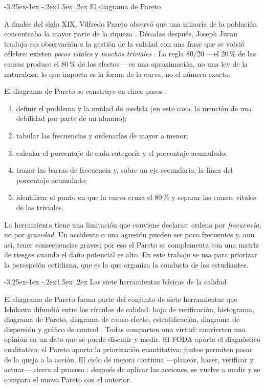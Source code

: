 \documentclass[11pt,a4paper]{article}
\makeatletter
\renewcommand\subsection{\@startsection{subsection}{2}{\z@}%
  {-3.25ex\@plus -1ex \@minus -.2ex}{1.5ex \@plus .2ex}%
  {\normalfont\large\bfseries\color{uazblue!85!black}}}
\makeatother
\begin{document}
\subsection{El diagrama de Pareto}

A finales del siglo XIX, Vilfredo Pareto observó que una minoría de la población
concentraba la mayor parte de la riqueza \cite{pareto1896}. Décadas después,
Joseph Juran tradujo esa observación a la gestión de la calidad con una frase
que se volvió célebre: existen \emph{pocos vitales} y \emph{muchos triviales}
\cite{juran2015}. La regla 80/20 ---el 20\,\% de las causas produce el 80\,\% de
los efectos--- es una aproximación, no una ley de la naturaleza; lo que importa
es la forma de la curva, no el número exacto.

El diagrama de Pareto se construye en cinco pasos \cite{gutierrez2014}:
\begin{enumerate}
  \item definir el problema y la unidad de medida (en este caso, la mención de
        una debilidad por parte de un alumno);
  \item tabular las frecuencias y ordenarlas de mayor a menor;
  \item calcular el porcentaje de cada categoría y el porcentaje acumulado;
  \item trazar las barras de frecuencia y, sobre un eje secundario, la línea
        del porcentaje acumulado;
  \item identificar el punto en que la curva cruza el 80\,\% y separar las
        causas vitales de las triviales.
\end{enumerate}

La herramienta tiene una limitación que conviene declarar: ordena por
\emph{frecuencia}, no por \emph{gravedad}. Un accidente o una agresión pueden
ser poco frecuentes y, aun así, tener consecuencias graves; por eso el Pareto
se complementa con una matriz de riesgos cuando el daño potencial es alto. En
este trabajo se usa para priorizar la percepción cotidiana, que es la que
organiza la conducta de los estudiantes.

\subsection{Las siete herramientas básicas de la calidad}

El diagrama de Pareto forma parte del conjunto de siete herramientas que
Ishikawa difundió entre los círculos de calidad: hoja de verificación,
histograma, diagrama de Pareto, diagrama de causa-efecto, estratificación,
diagrama de dispersión y gráfico de control \cite{ishikawa1986}. Todas
comparten una virtud: convierten una opinión en un dato que se puede discutir y
medir. El FODA aporta el diagnóstico cualitativo; el Pareto aporta la
priorización cuantitativa; juntos permiten pasar de la queja a la acción. El
ciclo de mejora continua ---planear, hacer, verificar y actuar--- cierra el
proceso \cite{deming1989}: después de aplicar las acciones, se vuelve a medir y
se compara el nuevo Pareto con el anterior.
\end{document}
